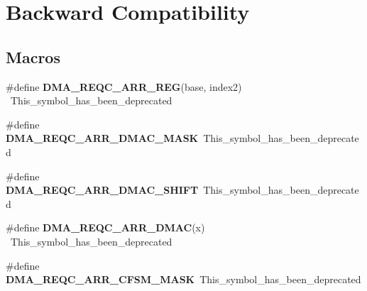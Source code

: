 \hypertarget{group___backward___compatibility___symbols}{}\section{Backward Compatibility}
\label{group___backward___compatibility___symbols}
\subsection*{Macros}
\begin{DoxyCompactItemize}
\item 
\hypertarget{group___backward___compatibility___symbols_gab08b1c5dd92986ed8884c5bb0824cca9}{}\#define {\bfseries D\+M\+A\+\_\+\+R\+E\+Q\+C\+\_\+\+A\+R\+R\+\_\+\+R\+E\+G}(base,  index2)                    ~This\+\_\+symbol\+\_\+has\+\_\+been\+\_\+deprecated\label{group___backward___compatibility___symbols_gab08b1c5dd92986ed8884c5bb0824cca9}

\item 
\hypertarget{group___backward___compatibility___symbols_ga8e9317db9c352716b95281ed740c533e}{}\#define {\bfseries D\+M\+A\+\_\+\+R\+E\+Q\+C\+\_\+\+A\+R\+R\+\_\+\+D\+M\+A\+C\+\_\+\+M\+A\+S\+K}~This\+\_\+symbol\+\_\+has\+\_\+been\+\_\+deprecated\label{group___backward___compatibility___symbols_ga8e9317db9c352716b95281ed740c533e}

\item 
\hypertarget{group___backward___compatibility___symbols_gabcd06f16caa331a970dac85d4d707107}{}\#define {\bfseries D\+M\+A\+\_\+\+R\+E\+Q\+C\+\_\+\+A\+R\+R\+\_\+\+D\+M\+A\+C\+\_\+\+S\+H\+I\+F\+T}~This\+\_\+symbol\+\_\+has\+\_\+been\+\_\+deprecated\label{group___backward___compatibility___symbols_gabcd06f16caa331a970dac85d4d707107}

\item 
\hypertarget{group___backward___compatibility___symbols_gab60dcd6bbc229736278d16e8ea267f15}{}\#define {\bfseries D\+M\+A\+\_\+\+R\+E\+Q\+C\+\_\+\+A\+R\+R\+\_\+\+D\+M\+A\+C}(x)                                      ~This\+\_\+symbol\+\_\+has\+\_\+been\+\_\+deprecated\label{group___backward___compatibility___symbols_gab60dcd6bbc229736278d16e8ea267f15}

\item 
\hypertarget{group___backward___compatibility___symbols_gaa28ab53f19cb06ff7ab8a03dfc646355}{}\#define {\bfseries D\+M\+A\+\_\+\+R\+E\+Q\+C\+\_\+\+A\+R\+R\+\_\+\+C\+F\+S\+M\+\_\+\+M\+A\+S\+K}~This\+\_\+symbol\+\_\+has\+\_\+been\+\_\+deprecated\label{group___backward___compatibility___symbols_gaa28ab53f19cb06ff7ab8a03dfc646355}


\end{DoxyCompactItemize}

